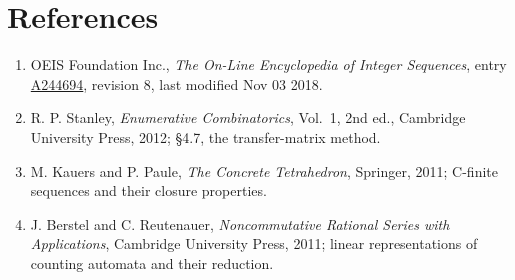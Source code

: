 \documentclass[11pt]{article}
\theoremstyle{definition}
\begin{document}
\section{References}

\begin{enumerate}

\item OEIS Foundation Inc., \emph{The On-Line Encyclopedia of Integer Sequences}, entry \href{https://oeis.org/A244694}{A244694}, revision 8, last modified Nov 03 2018.

\item R. P. Stanley, \emph{Enumerative Combinatorics}, Vol.~1, 2nd ed., Cambridge University Press, 2012; \S4.7, the transfer-matrix method.

\item M. Kauers and P. Paule, \emph{The Concrete Tetrahedron}, Springer, 2011; C-finite sequences and their closure properties.

\item J. Berstel and C. Reutenauer, \emph{Noncommutative Rational Series with Applications}, Cambridge University Press, 2011; linear representations of counting automata and their reduction.

\end{enumerate}
\end{document}
